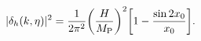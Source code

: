 \begin{equation}
|\delta_{h}(k,\eta)|^2 = \frac{1}{2\pi^2} \biggl(\frac{H}{M_{\rm P}}\biggr)^2 
\biggl[ 1 - \frac{\sin{2 x_0}}{x_0}\biggr].
\end{equation}

